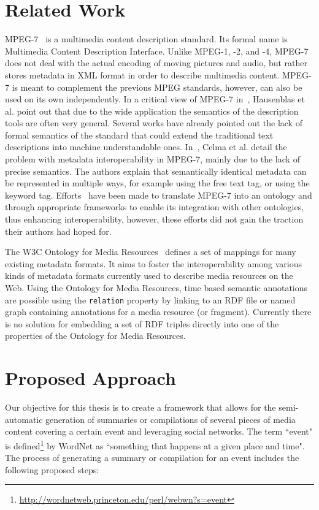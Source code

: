 \documentclass[runningheads,a4paper]{llncs}
\begin{document}
\section{Related Work}
MPEG-7~\cite{mpeg7} is a multimedia content description standard. Its formal name is Multimedia Content Description Interface. Unlike MPEG-1, -2, and -4, MPEG-7 does not deal with the actual encoding of moving pictures and audio, but rather stores metadata in XML format in order to describe multimedia content. MPEG-7 is meant to complement the previous MPEG standards, however, can also be used on its own independently. In a critical view of MPEG-7 in~\cite{Hau07}, Hausenblas et al. point out that due to the wide application the semantics of the description tools are often very general. Several works have already pointed out the lack of formal semantics of the standard that could extend the traditional text descriptions into machine understandable ones. In~\cite{Celma2007}, Celma et al. detail the problem with metadata interoperability in MPEG-7, mainly due to the lack of precise semantics. The authors explain that semantically identical metadata can be represented in multiple ways, for example using the free text tag, or using the keyword tag. Efforts~\cite{garca_semantic_2005-1} have been made to translate MPEG-7 into an ontology and through appropriate frameworks to enable its integration with other ontologies, thus enhancing interoperability, however, these efforts did not gain the traction their authors had hoped for.

The W3C Ontology for Media Resources~\cite{mediaontology} defines a set of mappings for many existing metadata formats. It aims to foster the interoperability among various kinds of metadata formats currently used to describe media resources on the Web. Using the Ontology for Media Resources, time based semantic annotations are possible using the \texttt{relation} property by linking to an RDF file or named graph containing annotations for a media resource (or fragment). Currently there is no solution for embedding a set of RDF triples directly into one of the properties of the Ontology for Media Resources.

\section{Proposed Approach}
Our objective for this thesis is to create a framework that allows for the semi-automatic generation of summaries or compilations of several pieces of media content covering a certain event and leveraging social networks. The term ``event" is defined\footnote{\url{http://wordnetweb.princeton.edu/perl/webwn?s=event}} by WordNet as ``something that happens at a given place and time". The process of generating a summary or compilation for an event includes the following proposed steps:
\end{document}
